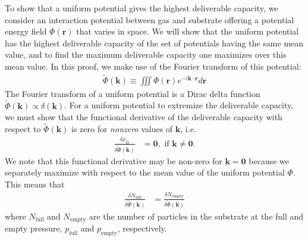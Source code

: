 \documentclass[twoside,twocolumn,9pt]{article}
\newcommand{\rvec}{\mathbf{r}}
\newcommand{\kvec}{\mathbf{k}}
\newcommand\V{\Phi}
\newcommand\Vk{\tilde\Phi(\kvec)}
\newcommand\pfull{\ensuremath{p_{\text{full}}}}
\newcommand\pempty{\ensuremath{p_{\text{empty}}}}
\begin{document}
To show that a uniform potential gives the highest deliverable capacity, we
consider an interaction potential between gas and substrate offering a
potential energy field $\V(\rvec)$ that varies in space. We will show that the
uniform potential has the highest deliverable capacity of the set of potentials
having the same mean value, and to find the maximum deliverable capacity one
maximizes over this mean value. In this proof, we make use of the Fourier
transform of this potential:
\begin{align}
    \Vk \equiv \iiint \V(\rvec) e^{-i\kvec\cdot \rvec} d\rvec
\end{align}
The Fourier transform of a uniform potential is a Dirac delta function
$\tilde{\V}(\kvec)\propto\delta(\kvec)$. For a uniform potential to extremize
the deliverable capacity, we must show that the functional derivative of the
deliverable capacity with respect to $\Vk$ is zero for \emph{nonzero} values of
$\kvec$, i.e.
\begin{align}
    \frac{\delta \rho_D}{\delta \Vk} &= \mathbf{0}, \text{ if } \kvec\ne \mathbf{0}.
\end{align}
We note that this functional derivative may be non-zero for $\kvec=\mathbf{0}$
because we separately maximize with respect to the mean value of the uniform
potential $\V$. This means that
\begin{align}
    \frac{\delta N_\text{full}}{\delta \Vk} &= \frac{\delta N_\text{empty}}{\delta \Vk}
\end{align}
where $N_\text{full}$ and $N_\text{empty}$ are the number of particles in the
substrate at the full and empty pressure, $\pfull$ and $\pempty$, respectively.
\end{document}
